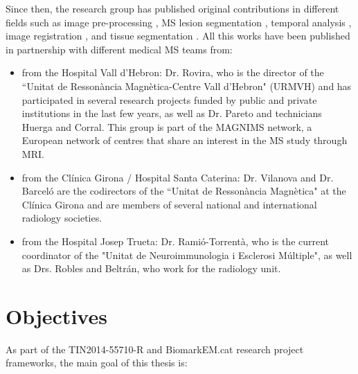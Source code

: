 Since then, the research group has published original contributions in different fields such as image pre-processing \cite{Roura2014}, MS lesion segmentation \cite{Cabezas2014, Cabezas2014b, Llado2012, Roura2015}, temporal analysis \cite{Ganiler2014,Llado2012b}, image registration \cite{Diez2014, Roura2015b}, and tissue segmentation \cite{Cabezas2011}. All this works have been published in partnership with different medical MS teams from:

\begin{itemize}

	\item from the Hospital Vall d'Hebron: Dr. Rovira, who is the director of the ``Unitat de Resson\`{a}ncia Magn\`{e}tica-Centre Vall d'Hebron" (URMVH) and has participated in several research projects funded by public and private institutions in the last few years, as well as Dr. Pareto and technicians Huerga and Corral. This group is part of the MAGNIMS network, a European network of centres that share an interest in the MS study through MRI.
 
	 \item from the Cl\'{i}nica Girona / Hospital Santa Caterina: Dr. Vilanova and Dr. Barcel\'{o} are the codirectors of the ``Unitat de Resson\`{a}ncia Magn\`{e}tica" at the Cl\'{i}nica Girona and are members of several national and international radiology societies.
 
	\item from the Hospital Josep Trueta: Dr. Rami\'{o}-Torrent\`{a}, who is the current coordinator of the "Unitat de Neuroimmunologia i Esclerosi M\'{u}ltiple", as well as Drs. Robles and Beltr\'{a}n, who work for the radiology unit.

\end{itemize}


\section{Objectives}
\label{sec:objectives}

As part of the TIN2014-55710-R and BiomarkEM.cat research project frameworks, the main goal of this thesis is: 

\begin{center}
\end{center}

